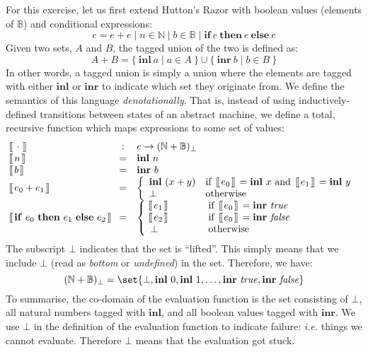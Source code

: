 \documentclass[10pt,a4paper]{exam}
\newcommand {\lbrac} {\makebox[0pt]{[\kern-1ex[}}
\newcommand {\rbrac} {\makebox[0pt]{]\kern-1ex]}}
\newcommand{\denote}[1]{\lbrac~#1~\rbrac}
\begin{document}
\begin{questions}
For this exercise, let us first extend Hutton's Razor with boolean values (elements of $\mathbb{B}$) and conditional expressions:
\begin{displaymath}
e = e + e \mid n \in \mathbb{N} \mid b \in \mathbb{B} \mid \mathbf{if}~e~\mathbf{then}~e~\mathbf{else}~e
\end{displaymath}
Given two sets, $A$ and $B$, the tagged union of the two is defined as:
\begin{displaymath}
A + B = \{~\mathbf{inl}~a \mid a \in A~\} \cup \{~\mathbf{inr}~b \mid b \in B~\}
\end{displaymath}  
In other words, a tagged union is simply a union where the elements are tagged with either $\mathbf{inl}$ or $\mathbf{inr}$ to indicate which set they originate from.
We define the semantics of this language \emph{denotationally}. That is, instead of using inductively-defined transitions between states of an abstract machine, we define a total, recursive function which maps expressions to some set of values:
\begin{displaymath}
\begin{array}{lcl}
\denote{\cdot} & : & e \to (\mathbb{N} + \mathbb{B})_{\bot}\\
\denote{n}         & = & \mathbf{inl}~n \\
\denote{b}         & = & \mathbf{inr}~b \\
\denote{e_0 + e_1} & = & \left\{ \begin{array}{ll}
\mathbf{inl}~(x + y) & \text{if } ~\denote{e_0}~ = \mathbf{inl}~x \text{ and } ~\denote{e_1}~ = \mathbf{inl}~y \\
\bot & \text{otherwise}
\end{array}  \right.\\
\denote{\mathbf{if}~e_0~\mathbf{then}~e_1~\mathbf{else}~e_2} & = & \left\{\begin{array}{ll}
\denote{e_1} & \qquad \quad \; \text{if } ~\denote{e_0}~ = \mathbf{inr}~\mathit{true}\\
\denote{e_2} & \qquad \quad \; \text{if } ~\denote{e_0}~ = \mathbf{inr}~\mathit{false}\\
\bot         & \qquad \quad \; \text{otherwise}
\end{array}\right.
\end{array}
\end{displaymath}
The subscript $\bot$ indicates that the set is ``lifted''. This simply means that we include $\bot$ (read as \emph{bottom} or \emph{undefined}) in the set. Therefore, we have:
\begin{displaymath}
(\mathbb{N} + \mathbb{B})_{\bot} = \set{\bot, \mathbf{inl}~0,\mathbf{inl}~1, \ldots, \mathbf{inr}~\mathit{true}, \mathbf{inr}~\mathit{false}}
\end{displaymath}
To summarise, the co-domain of the evaluation function is the set consisting of $\bot$, all natural numbers tagged with $\mathbf{inl}$, and all boolean values tagged with $\mathbf{inr}$. We use $\bot$ in the definition of the evaluation function to indicate failure: \emph{i.e.} things we cannot evaluate. Therefore $\bot$ means that the evaluation got stuck.


\end{questions}
\end{document}
